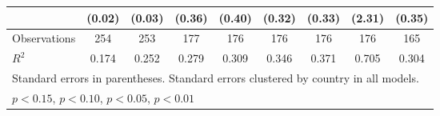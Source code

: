 \documentclass[12pt, letterpaper]{article}
\begin{document}
\begin{landscape}
\begin{table}[htbp]
\begin{footnotesize}
\begin{tabular}{l*{8}{c}}
                    &      (0.02)         &      (0.03)         &      (0.36)         &      (0.40)         &      (0.32)         &      (0.33)         &      (2.31)         &      (0.35)         \\
\hline
Observations        &         254         &         253         &         177         &         176         &         176         &         176         &         176         &         165         \\
\(R^{2}\)           &       0.174         &       0.252         &       0.279         &       0.309         &       0.346         &       0.371         &       0.705         &       0.304         \\
\hline\hline
\multicolumn{9}{l}{\footnotesize Standard errors in parentheses. Standard errors clustered by country in all models.}\\
\multicolumn{9}{l}{\footnotesize \sym{+} \(p<0.15\), \sym{*} \(p<0.10\), \sym{**} \(p<0.05\), \sym{***} \(p<0.01\)}\\
\end{tabular}
\end{footnotesize}
\end{table}
\end{landscape}
\end{document}
